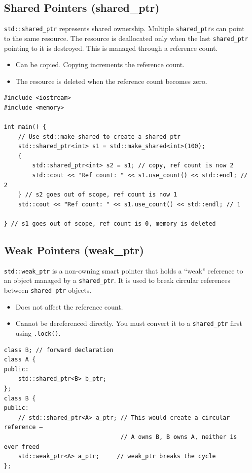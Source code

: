 \subsection{Shared Pointers (shared\_ptr)}
\texttt{std::shared\_ptr} represents shared ownership. Multiple \texttt{shared\_ptr}s can point to the same resource. The resource is deallocated only when the last \texttt{shared\_ptr} pointing to it is destroyed. This is managed through a reference count.
\begin{itemize}
    \item Can be copied. Copying increments the reference count.
    \item The resource is deleted when the reference count becomes zero.
\end{itemize}
\begin{lstlisting}
#include <iostream>
#include <memory>

int main() {
	// Use std::make_shared to create a shared_ptr
	std::shared_ptr<int> s1 = std::make_shared<int>(100);
	{
		std::shared_ptr<int> s2 = s1; // copy, ref count is now 2
		std::cout << "Ref count: " << s1.use_count() << std::endl; // 2
	} // s2 goes out of scope, ref count is now 1
	std::cout << "Ref count: " << s1.use_count() << std::endl; // 1

} // s1 goes out of scope, ref count is 0, memory is deleted
\end{lstlisting}

\subsection{Weak Pointers (weak\_ptr)}
\texttt{std::weak\_ptr} is a non-owning smart pointer that holds a ``weak'' reference to an object managed by a \texttt{shared\_ptr}. It is used to break circular references between \texttt{shared\_ptr} objects.
\begin{itemize}
    \item Does not affect the reference count.
    \item Cannot be dereferenced directly. You must convert it to a \texttt{shared\_ptr} first using \texttt{.lock()}.
\end{itemize}
\begin{lstlisting}
class B; // forward declaration
class A {
public:
	std::shared_ptr<B> b_ptr;
};
class B {
public:
	// std::shared_ptr<A> a_ptr; // This would create a circular reference —
	                             // A owns B, B owns A, neither is ever freed
	std::weak_ptr<A> a_ptr;     // weak_ptr breaks the cycle
};
\end{lstlisting}

